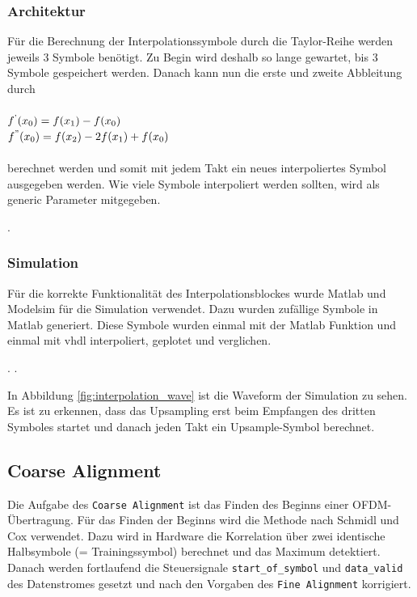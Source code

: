 \subsubsection{Architektur}
Für die Berechnung der Interpolationssymbole durch die Taylor-Reihe werden jeweils 3 Symbole benötigt. Zu Begin wird deshalb so lange gewartet, bis 3 Symbole gespeichert werden. Danach kann nun die erste und zweite Abbleitung durch
\\
\\
$f\textsuperscript{'}(x\textsubscript{0})=f(x\textsubscript{1})-f(x\textsubscript{0}) $\\
\noindent $f\textsuperscript{''}(x\textsubscript{0})=f(x\textsubscript{2})-2f(x\textsubscript{1})+f(x\textsubscript{0}) $
\\
\\
\noindent berechnet werden und somit mit jedem Takt ein neues interpoliertes Symbol ausgegeben werden. Wie viele Symbole interpoliert werden sollten, wird als generic Parameter mitgegeben.

.



\subsubsection{Simulation}

Für die korrekte Funktionalität des Interpolationsblockes wurde Matlab und Modelsim für die Simulation verwendet. Dazu wurden zufällige Symbole in Matlab generiert. Diese Symbole wurden einmal mit der Matlab Funktion und einmal mit vhdl interpoliert, geplotet und verglichen.


.
.

\noindent In Abbildung \ref{fig:interpolation_wave} ist die Waveform der Simulation zu sehen. Es ist zu erkennen, dass das Upsampling erst beim Empfangen des dritten Symboles startet und danach jeden Takt ein Upsample-Symbol berechnet.

\subsection{Coarse Alignment}
Die Aufgabe des \texttt{Coarse Alignment} ist das Finden des Beginns einer OFDM-Übertragung. Für das Finden der Beginns wird die Methode nach Schmidl und Cox verwendet. Dazu wird in Hardware die Korrelation über zwei identische Halbsymbole (= Trainingssymbol) berechnet und das Maximum detektiert. Danach werden fortlaufend die Steuersignale \texttt{start\_of\_symbol} und \texttt{data\_valid} des Datenstromes gesetzt und nach den Vorgaben des \texttt{Fine Alignment} korrigiert.

